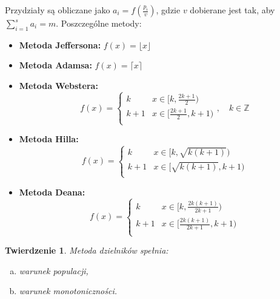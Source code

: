 \documentclass[12pt,a4paper]{article}
\theoremstyle{break}
\newtheorem{theorem}{Twierdzenie}[section]
\begin{document}
		\noindent Przydziały są obliczane jako $a_i = f\left(\frac{p_i}{v}\right)$, gdzie $v$ dobierane jest tak, aby $\sum_{i=1}^s a_i = m$. Poszczególne metody:
		\begin{itemize}
			\item \textbf{Metoda Jeffersona:} $f(x) = \lfloor x \rfloor$
			\item \textbf{Metoda Adamsa:} $f(x) = \lceil x \rceil$
			\item \textbf{Metoda Webstera:}
			\[
			f(x) =
			\begin{cases} 
				k & x \in [k, \frac{2k+1}{2}) \\
				k+1 & x \in [\frac{2k+1}{2}, k+1) \\
			\end{cases}, \quad k \in \mathbb{Z}
			\]
			\item \textbf{Metoda Hilla:}
			\[
			f(x) =
			\begin{cases} 
				k & x \in [k, \sqrt{k(k+1)}) \\
				k+1 & x \in [\sqrt{k(k+1)}, k+1) \\
			\end{cases}
			\]
			\item \textbf{Metoda Deana:}
			\[
			f(x) =
			\begin{cases} 
				k & x \in [k, \frac{2k(k+1)}{2k+1}) \\
				k+1 & x \in [\frac{2k(k+1)}{2k+1}, k+1) \\
			\end{cases}
			\]
		\end{itemize}
	
	
	\begin{theorem}
		Metoda dzielników spełnia:
		\begin{enumerate}[a)]
			\item warunek populacji,
			\item warunek monotoniczności.
		\end{enumerate}
	\end{theorem}
	
\end{document}

